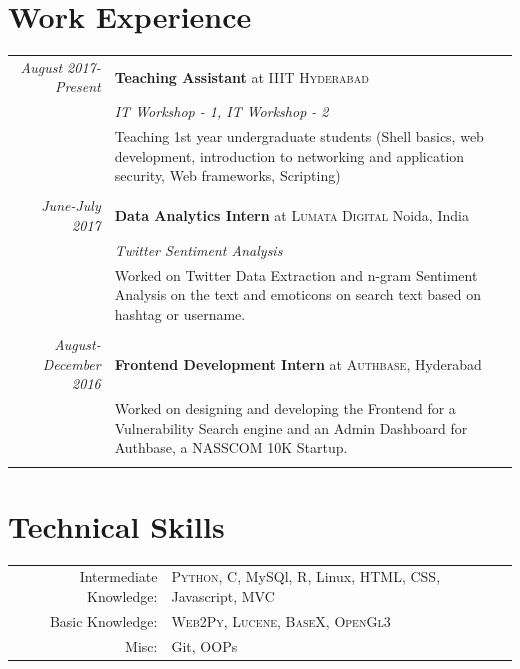\documentclass[a4paper,10pt]{article}
\begin{document}
\section{Work Experience}
\begin{tabular}{r|p{11cm}}


 \emph{August 2017-Present} & \textbf{Teaching Assistant} at \textsc{IIIT Hyderabad} \\\textsc{}&\emph{IT Workshop - 1, IT Workshop - 2}\\&\footnotesize{Teaching 1st year undergraduate students (Shell basics, web
development, introduction to networking and application security, Web frameworks, Scripting)}\\\multicolumn{2}{c}{} \\
 

 \emph{June-July 2017} &\textbf{ Data Analytics Intern} at \textsc{Lumata Digital} Noida, India \\\textsc{}&\emph{Twitter Sentiment Analysis}\\&\footnotesize{Worked on Twitter Data Extraction and n-gram Sentiment Analysis on the text and emoticons on search text based on hashtag or username.}\\\multicolumn{2}{c}{} \\
 
 \emph{August-December 2016} &  \textbf{Frontend Development Intern} at \textsc{Authbase}, Hyderabad \\&\footnotesize{ Worked on designing and developing the Frontend for a Vulnerability Search engine and an Admin Dashboard for Authbase, a NASSCOM 10K Startup.}\\\multicolumn{2}{c}{} \\
\end{tabular}






\section{Technical Skills}
\begin{tabular}{rl}
Intermediate Knowledge:& \textsc{Python}, C, MySQl, R, Linux, HTML, CSS, Javascript, MVC\\
Basic Knowledge:& \textsc{Web2Py}, \textsc{Lucene}, \textsc{BaseX},  \textsc{OpenGl3}\\
Misc: &Git, OOPs 
 \setmainfont[SmallCapsFont=Fontin-SmallCaps.otf]{Fontin.otf}\\

\end{tabular}
\end{document}
